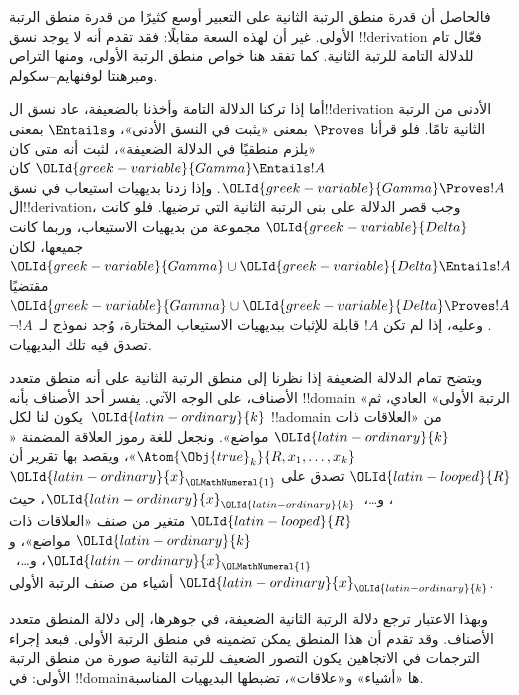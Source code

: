 \documentclass[../../../include/open-logic-section]{subfiles}
\begin{document}
فالحاصل أن قدرة منطق الرتبة الثانية على التعبير أوسع كثيرًا
من قدرة منطق الرتبة الأولى. غير أن لهذه السعة مقابلًا: فقد
تقدم أنه لا يوجد نسق !!{derivation} فعّال تام للدلالة التامة
للرتبة الثانية. كما تفقد هنا خواص منطق الرتبة الأولى، ومنها
التراص ومبرهنتا لوفنهايم--سكولم.

أما إذا تركنا الدلالة التامة وأخذنا بالضعيفة، عاد نسق
ال!!{derivation} الأدنى من الرتبة الثانية تامًا. فلو قرأنا
$\Proves$ بمعنى «يثبت في النسق الأدنى»، و$\Entails$ بمعنى
«يلزم منطقيًا في الدلالة الضعيفة»، لثبت أنه متى كان
$\OLId{greek-variable}{Gamma} \Entails !A$ كان $\OLId{greek-variable}{Gamma} \Proves
!A$. وإذا زدنا بديهيات استيعاب في نسق ال!!{derivation}، وجب
قصر الدلالة على بنى الرتبة الثانية التي ترضيها. فلو كانت
$\OLId{greek-variable}{Delta}$ مجموعة من بديهيات الاستيعاب، وربما كانت جميعها، لكان
$\OLId{greek-variable}{Gamma} \cup \OLId{greek-variable}{Delta} \Entails
!A$ مقتضيًا $\OLId{greek-variable}{Gamma} \cup \OLId{greek-variable}{Delta} \Proves !A$.
وعليه، إذا لم تكن $!A$ قابلة للإثبات ببديهيات الاستيعاب
المختارة، وُجد نموذج لـ~$\lnot !A$ تصدق فيه تلك البديهيات.

ويتضح تمام الدلالة الضعيفة إذا نظرنا إلى منطق الرتبة الثانية
على أنه منطق متعدد الأصناف، على الوجه الآتي.
يفسر أحد الأصناف بأنه !!{domain} «الرتبة الأولى» العادي، ثم يكون لنا
لكل~$\OLId{latin-ordinary}{k}$ !!a{domain} من «العلاقات ذات $\OLId{latin-ordinary}{k}$ مواضع». ونجعل للغة رموز
العلاقة المضمنة «$\Atom{\Obj{true}_k}{R,x_1,\dots,x_k}$»، ويقصد بها
تقرير أن $\OLId{latin-looped}{R}$ تصدق على $\OLId{latin-ordinary}{x}_\OLMathNumeral{1}$، و\dots،~$\OLId{latin-ordinary}{x}_\OLId{latin-ordinary}{k}$، حيث $\OLId{latin-looped}{R}$ متغير من صنف
«العلاقات ذات $\OLId{latin-ordinary}{k}$ مواضع»، و$\OLId{latin-ordinary}{x}_\OLMathNumeral{1}$، و\dots،~$\OLId{latin-ordinary}{x}_\OLId{latin-ordinary}{k}$ أشياء من صنف الرتبة
الأولى.

وبهذا الاعتبار ترجع دلالة الرتبة الثانية الضعيفة، في جوهرها،
إلى دلالة المنطق متعدد الأصناف. وقد تقدم أن هذا المنطق يمكن
تضمينه في منطق الرتبة الأولى. فبعد إجراء الترجمات في الاتجاهين
يكون التصور الضعيف للرتبة الثانية صورة من منطق الرتبة الأولى:
في !!{domain}ها «أشياء» و«علاقات»، تضبطها البديهيات المناسبة.
\end{document}

